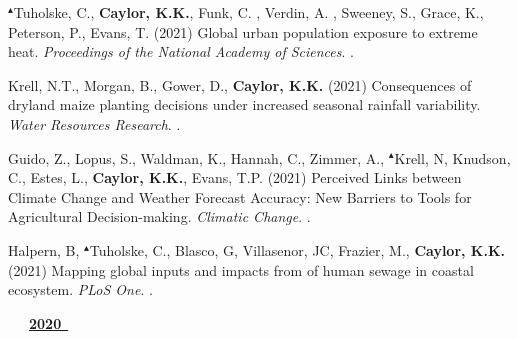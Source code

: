 \begin{etaremune}
\item $^{\blacktriangle}$Tuholske, C., \textbf{ Caylor, K.K.}, Funk, C. , Verdin, A. , Sweeney, S., Grace, K., Peterson, P., Evans, T. (2021) Global urban population exposure to extreme heat. \emph{Proceedings of the National Academy of Sciences}. .
\item Krell, N.T., Morgan, B., Gower, D., \textbf{ Caylor, K.K.} (2021) Consequences of dryland maize planting decisions under increased seasonal rainfall variability. \emph{Water Resources Research}. .
\item Guido, Z., Lopus, S., Waldman, K., Hannah, C., Zimmer, A., $^{\blacktriangle}$Krell, N, Knudson, C., Estes, L., \textbf{ Caylor, K.K.}, Evans, T.P. (2021) Perceived Links between Climate Change and Weather Forecast Accuracy: New Barriers to Tools for Agricultural Decision-making. \emph{Climatic Change}. .
\item Halpern, B, $^{\blacktriangle}$Tuholske, C., Blasco, G, Villasenor, JC, Frazier, M., \textbf{ Caylor, K.K.} (2021) Mapping global inputs and impacts from of human sewage in coastal ecosystem. \emph{PLoS One}. .

\vspace{0.1in}
\mbox{\ \ \ \underline{\textbf{2020 }}}
\vspace{0.1in}


\end{etaremune}
